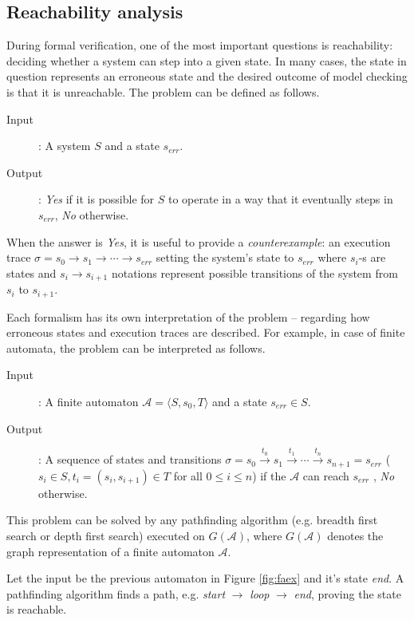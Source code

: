 \subsection{Reachability analysis}
During formal verification, one of the most important questions is reachability: deciding whether a system can step into a given state. In many cases, the state in question represents an erroneous state and the desired outcome of model checking is that it is unreachable. The problem can be defined as follows.
\begin{description}
	\item[Input]: A system $S$ and a state $s_{err}$.
	\item[Output]: \emph{Yes} if it is possible for $S$ to operate in a way that it eventually steps in $s_{err}$, \emph{No} otherwise.
\end{description}

When the answer is \emph{Yes}, it is useful to provide a \emph{counterexample}: an execution trace $\sigma = s_0 \to s_1 \to \cdots \to s_{err}$ setting the system's state to $s_{err}$ where $s_i$-s are states  and $s_i \to s_{i+1}$ notations represent possible transitions of the system from $s_i$ to $s_{i+1}$.

Each formalism has its own interpretation of the problem -- regarding how erroneous states and execution traces are described. For example, in case of finite automata, the problem can be interpreted as follows. 

\begin{description}
	\item[Input]: A finite automaton $\mathcal{A}=\langle S,s_0,T\rangle$ and a state $s_{err} \in S$.
	\item[Output]: A sequence of states and transitions $\sigma = s_0 \xrightarrow{t_0} s_1 \xrightarrow{t_1} \cdots \xrightarrow{t_n} s_{n+1}=s_{err}$ ($s_i \in S, t_i=(s_i,s_{i+1}) \in T$ for all $0 \leq i \leq n$) if the $\mathcal{A}$ can reach $s_{err}$ , \emph{No} otherwise.
\end{description}

This problem can be solved by any pathfinding algorithm (e.g. breadth first search or depth first search) executed on $G(\mathcal{A})$, where $G(\mathcal{A})$ denotes the graph representation of a finite automaton $\mathcal{A}$.

\begin{example}
	Let the input be the previous automaton in Figure \ref{fig:faex} and it's state \emph{end}. A pathfinding algorithm finds a path, e.g. \emph{start} $\to$ \emph{loop} $\to$ \emph{end}, proving the state is reachable. 
\end{example}

